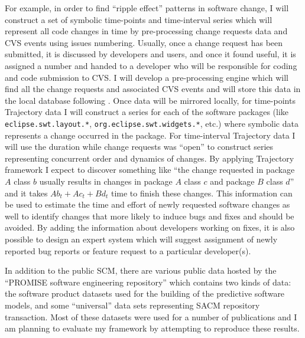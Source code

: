 For example, in order to find ``ripple effect'' patterns in software change, I will construct a set of symbolic time-points and time-interval series which will represent all code changes in time by pre-processing change requests data and CVS events using issues numbering. Usually, once a change request has been submitted, it is discussed by developers and users, and once it found useful, it is assigned a number and handed to a developer who will be responsible for coding and code submission to CVS. I will develop a pre-processing engine which will find all the change requests and associated CVS events and will store this data in the local database following \cite{citeulike:5333719}. Once data will be mirrored locally, for time-points Trajectory data I will construct a series for each of the software packages (like \texttt{eclipse.swt.layout.*}, \texttt{org.eclipse.swt.widgets.*}, etc.) where symbolic data represents a change occurred in the package. For time-interval Trajectory data I will use the duration while change requests was ``open'' to construct series representing concurrent order and dynamics of changes. By applying Trajectory framework I expect to discover something like ``the change requested in package $A$ class $b$ usually results in changes in package $A$ class $c$ and package $B$ class $d$'' and it takes $Ab_{t} + Ac_{t} + Bd_{t}$ time to finish these changes. This information can be used to estimate the time and effort of newly requested software changes as well to identify changes that more likely to induce bugs and fixes and should be avoided. By adding the information about developers working on fixes, it is also possible to design an expert system which will suggest assignment of newly reported bug reports or feature request to a particular developer(s).

In addition to the public SCM, there are various public data hosted by the ``PROMISE software engineering repository'' \cite{Sayyad:2005} which contains two kinds of data: the software product datasets used for the building of the predictive software models, and some ``universal'' data sets representing SACM repository transaction. Most of these datasets were used for a number of publications and I am planning to evaluate my framework by attempting to reproduce these results. 
